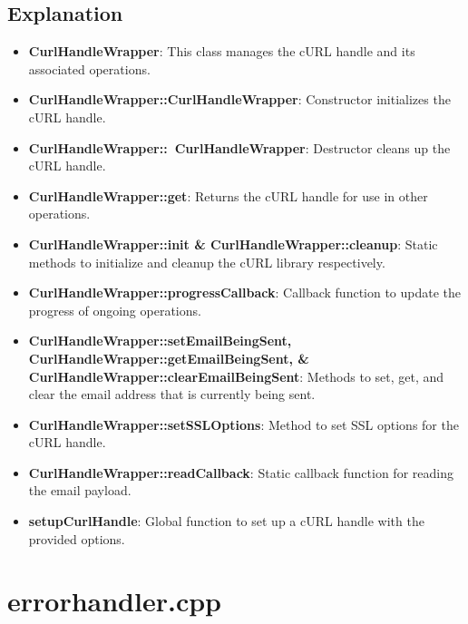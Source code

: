 \documentclass{article}
\begin{document}
	\subsection*{Explanation}
	\begin{itemize}
		\item \textbf{CurlHandleWrapper}: This class manages the cURL handle and its associated operations.
		\item \textbf{CurlHandleWrapper::CurlHandleWrapper}: Constructor initializes the cURL handle.
		\item \textbf{CurlHandleWrapper::~CurlHandleWrapper}: Destructor cleans up the cURL handle.
		\item \textbf{CurlHandleWrapper::get}: Returns the cURL handle for use in other operations.
		\item \textbf{CurlHandleWrapper::init \& CurlHandleWrapper::cleanup}: Static methods to initialize and cleanup the cURL library respectively.
		\item \textbf{CurlHandleWrapper::progressCallback}: Callback function to update the progress of ongoing operations.
		\item \textbf{CurlHandleWrapper::setEmailBeingSent, CurlHandleWrapper::getEmailBeingSent, \& CurlHandleWrapper::clearEmailBeingSent}: Methods to set, get, and clear the email address that is currently being sent.
		\item \textbf{CurlHandleWrapper::setSSLOptions}: Method to set SSL options for the cURL handle.
		\item \textbf{CurlHandleWrapper::readCallback}: Static callback function for reading the email payload.
		\item \textbf{setupCurlHandle}: Global function to set up a cURL handle with the provided options.
	\end{itemize}
	
	\section{errorhandler.cpp}
	
\end{document}
